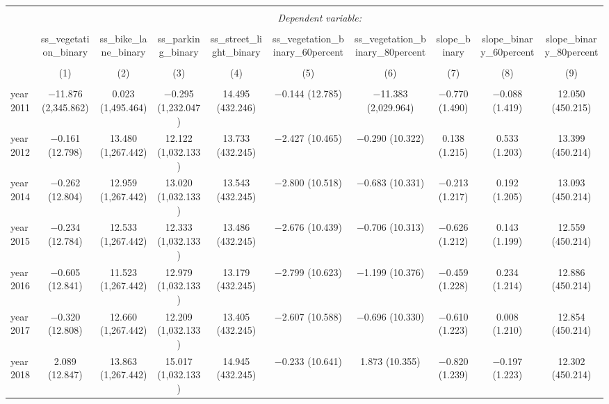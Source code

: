 
\begin{table}[!htbp] \centering 
  \caption{} 
  \label{} 
\small 
\begin{tabular}{@{\extracolsep{1pt}}lccccccccc} 
\\[-1.8ex]\hline 
\hline \\[-1.8ex] 
 & \multicolumn{9}{c}{\textit{Dependent variable:}} \\ 
\cline{2-10} 
\\[-1.8ex] & ss\_vegetation\_binary & ss\_bike\_lane\_binary & ss\_parking\_binary & ss\_street\_light\_binary & ss\_vegetation\_binary\_60percent & ss\_vegetation\_binary\_80percent & slope\_binary & slope\_binary\_60percent & slope\_binary\_80percent \\ 
\\[-1.8ex] & (1) & (2) & (3) & (4) & (5) & (6) & (7) & (8) & (9)\\ 
\hline \\[-1.8ex] 
 year2011 & $-$11.876 (2,345.862) & 0.023 (1,495.464) & $-$0.295 (1,232.047) & 14.495 (432.246) & $-$0.144 (12.785) & $-$11.383 (2,029.964) & $-$0.770 (1.490) & $-$0.088 (1.419) & 12.050 (450.215) \\ 
  year2012 & $-$0.161 (12.798) & 13.480 (1,267.442) & 12.122 (1,032.133) & 13.733 (432.245) & $-$2.427 (10.465) & $-$0.290 (10.322) & 0.138 (1.215) & 0.533 (1.203) & 13.399 (450.214) \\ 
  year2014 & $-$0.262 (12.804) & 12.959 (1,267.442) & 13.020 (1,032.133) & 13.543 (432.245) & $-$2.800 (10.518) & $-$0.683 (10.331) & $-$0.213 (1.217) & 0.192 (1.205) & 13.093 (450.214) \\ 
  year2015 & $-$0.234 (12.784) & 12.533 (1,267.442) & 12.333 (1,032.133) & 13.486 (432.245) & $-$2.676 (10.439) & $-$0.706 (10.313) & $-$0.626 (1.212) & 0.143 (1.199) & 12.559 (450.214) \\ 
  year2016 & $-$0.605 (12.841) & 11.523 (1,267.442) & 12.979 (1,032.133) & 13.179 (432.245) & $-$2.799 (10.623) & $-$1.199 (10.376) & $-$0.459 (1.228) & 0.234 (1.214) & 12.886 (450.214) \\ 
  year2017 & $-$0.320 (12.808) & 12.660 (1,267.442) & 12.209 (1,032.133) & 13.405 (432.245) & $-$2.607 (10.588) & $-$0.696 (10.330) & $-$0.610 (1.223) & 0.008 (1.210) & 12.854 (450.214) \\ 
  year2018 & 2.089 (12.847) & 13.863 (1,267.442) & 15.017 (1,032.133) & 14.945 (432.245) & $-$0.233 (10.641) & 1.873 (10.355) & $-$0.820 (1.239) & $-$0.197 (1.223) & 12.302 (450.214) \\ 

\end{tabular}
\end{table}
